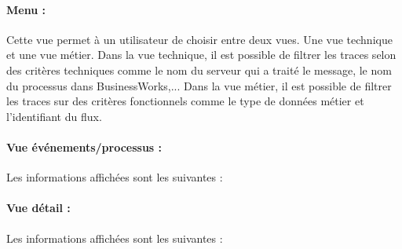 \paragraph{Menu : }Cette vue permet à un utilisateur de choisir entre deux vues. Une vue technique et une vue métier. Dans la vue technique, il est possible de filtrer les traces selon des critères techniques comme le nom du serveur qui a traité le message, le nom du processus dans BusinessWorks,... Dans la vue métier, il est possible de filtrer les traces sur des critères fonctionnels comme le type de données métier et l'identifiant du flux.

\paragraph{Vue événements/processus :} Les informations affichées sont les suivantes :
\paragraph{Vue détail : } Les informations affichées sont les suivantes :
